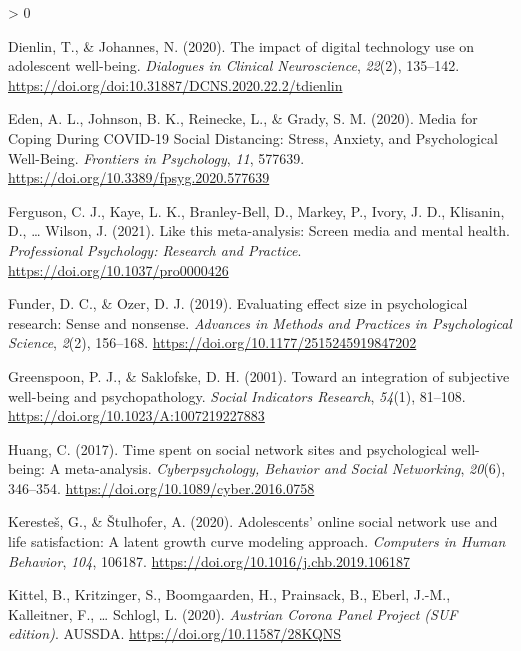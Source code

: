\documentclass[
  english,
  man,mask,floatsintext]{apa6}
\newlength{\cslhangindent}
\newenvironment{CSLReferences}[2] %
 {%
  \setlength{\parindent}{0pt}
  \ifodd #1 \everypar{\setlength{\hangindent}{\cslhangindent}}\ignorespaces\fi
  \ifnum #2 > 0
  \setlength{\parskip}{#2\baselineskip}
  \fi
 }%
 {}
\begin{document}
\begin{CSLReferences}{1}{0}
\leavevmode\hypertarget{ref-dienlinImpactDigitalTechnology2020}{}%
Dienlin, T., \& Johannes, N. (2020). The impact of digital technology use on adolescent well-being. \emph{Dialogues in Clinical Neuroscience}, \emph{22}(2), 135--142. \url{https://doi.org/doi:10.31887/DCNS.2020.22.2/tdienlin}

\leavevmode\hypertarget{ref-edenMediaCopingCOVID192020}{}%
Eden, A. L., Johnson, B. K., Reinecke, L., \& Grady, S. M. (2020). Media for {Coping} {During} {COVID}-19 {Social} {Distancing}: {Stress}, {Anxiety}, and {Psychological} {Well}-{Being}. \emph{Frontiers in Psychology}, \emph{11}, 577639. \url{https://doi.org/10.3389/fpsyg.2020.577639}

\leavevmode\hypertarget{ref-fergusonThisMetaanalysisScreen2021}{}%
Ferguson, C. J., Kaye, L. K., Branley-Bell, D., Markey, P., Ivory, J. D., Klisanin, D., \ldots{} Wilson, J. (2021). Like this meta-analysis: {Screen} media and mental health. \emph{Professional Psychology: Research and Practice}. \url{https://doi.org/10.1037/pro0000426}

\leavevmode\hypertarget{ref-funderEvaluatingEffectSize2019}{}%
Funder, D. C., \& Ozer, D. J. (2019). Evaluating effect size in psychological research: {Sense} and nonsense. \emph{Advances in Methods and Practices in Psychological Science}, \emph{2}(2), 156--168. \url{https://doi.org/10.1177/2515245919847202}

\leavevmode\hypertarget{ref-greenspoonIntegrationSubjectiveWellbeing2001}{}%
Greenspoon, P. J., \& Saklofske, D. H. (2001). Toward an integration of subjective well-being and psychopathology. \emph{Social Indicators Research}, \emph{54}(1), 81--108. \url{https://doi.org/10.1023/A:1007219227883}

\leavevmode\hypertarget{ref-huangTimeSpentSocial2017}{}%
Huang, C. (2017). Time spent on social network sites and psychological well-being: {A} meta-analysis. \emph{Cyberpsychology, Behavior and Social Networking}, \emph{20}(6), 346--354. \url{https://doi.org/10.1089/cyber.2016.0758}

\leavevmode\hypertarget{ref-kerestesAdolescentsOnlineSocial2020}{}%
Keresteš, G., \& Štulhofer, A. (2020). Adolescents' online social network use and life satisfaction: {A} latent growth curve modeling approach. \emph{Computers in Human Behavior}, \emph{104}, 106187. \url{https://doi.org/10.1016/j.chb.2019.106187}

\leavevmode\hypertarget{ref-kittelAustrianCoronaPanel2020}{}%
Kittel, B., Kritzinger, S., Boomgaarden, H., Prainsack, B., Eberl, J.-M., Kalleitner, F., \ldots{} Schlogl, L. (2020). \emph{Austrian {Corona} {Panel} {Project} ({SUF} edition)}. AUSSDA. \url{https://doi.org/10.11587/28KQNS}


\end{CSLReferences}
\end{document}
